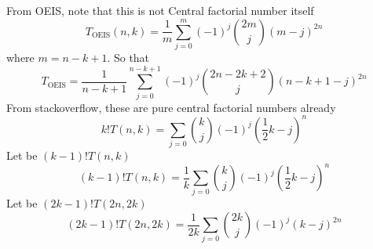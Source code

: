 From OEIS, note that this is not Central factorial number itself
\begin{equation*}
    T_{\mathrm{OEIS}} (n,k) = \frac{1}{m} \sum_{j=0}^{m} (-1)^{j} \binom{2m}{j} (m-j)^{2n}
\end{equation*}
where $m=n-k+1$.
So that
\begin{equation*}
    T_{\mathrm{OEIS}} = \frac{1}{n-k+1} \sum_{j=0}^{n-k+1} (-1)^{j} \binom{2n-2k+2}{j} (n-k+1-j)^{2n}
\end{equation*}
From stackoverflow, these are pure central factorial numbers already
\begin{equation*}
    k! T(n,k) = \sum_{j=0} \binom{k}{j} (-1)^{j} \left( \frac{1}{2}k - j \right)^{n}
\end{equation*}
Let be $(k-1)! T(n,k)$
\begin{equation*}
    (k-1)!T(n,k) = \frac{1}{k} \sum_{j=0} \binom{k}{j} (-1)^{j} \left( \frac{1}{2}k - j \right)^{n}
\end{equation*}
Let be $(2k-1)! T(2n, 2k)$
\begin{equation*}
    (2k-1)!T(2n, 2k) = \frac{1}{2k} \sum_{j=0} \binom{2k}{j} (-1)^{j} (k-j)^{2n}
\end{equation*}